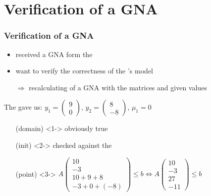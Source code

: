 \section{Verification of a GNA}
\frame{\tableofcontents[currentsection]}
\begin{frame}
	\frametitle{\color{white}Verification of a GNA}
	\begin{itemize}
		\item received a GNA form the \solver
		\item want to verify the correctness of the \solver's model
		\item[$\Rightarrow$] recalculating of a GNA with the matrices and given values
	\end{itemize}
	\begin{example}
		The \solver gave us: $y_1=\begin{pmatrix} 9 \\ 0 \end{pmatrix}$, $y_2=\begin{pmatrix} 8 \\ -8 \end{pmatrix}$, $\mu_1=0$\newline
		\begin{itemize}
			\setlength{\itemindent}{1.5cm}
			\item[(domain)]<1-> obviously true \checkmark
			\item[(init)]<2-> checked against the \stem \checkmark
			\item[(point)]<3->  $A\begin{pmatrix} 10 \\ -3 \\ 10+9+8 \\ -3 + 0 + (-8) \end{pmatrix} \le b \Leftrightarrow A\begin{pmatrix} 10 \\ -3 \\ 27 \\ -11 \end{pmatrix} \le b$ \checkmark
		\end{itemize}
	\end{example}
\end{frame}

